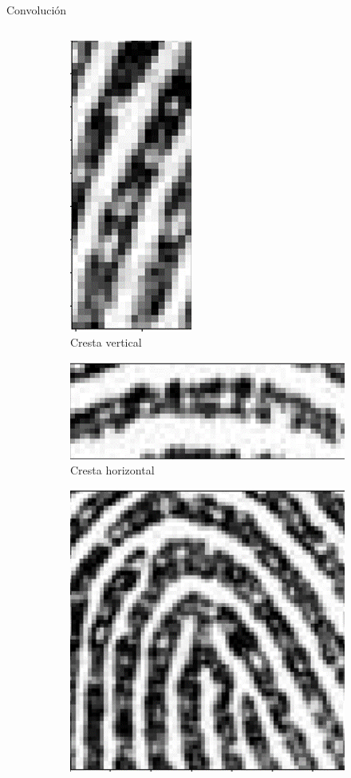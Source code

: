 \documentclass[12pt,aspectratio=169]{beamer}
\begin{document}
\begin{frame}{Convolución}
\begin{columns}[c]
\begin{itemize}
                \begin{figure}
                    \begin{subfigure}{0.21\textwidth}
                        \centering
                        \includegraphics[scale=0.1]{figs/fll_0.png}
                        \caption{Cresta vertical}
                    \end{subfigure}
                    \begin{subfigure}{0.21\textwidth}
                        \centering
                        \includegraphics[scale=0.1]{figs/fll_1.png}
                        \caption{Cresta horizontal}
                    \end{subfigure}
                    \begin{subfigure}{0.21\textwidth}
                        \centering
                        \includegraphics[scale=0.1]{figs/fhl_0.png}

\end{subfigure}
\end{figure}
\end{itemize}
\end{columns}
\end{frame}
\end{document}
